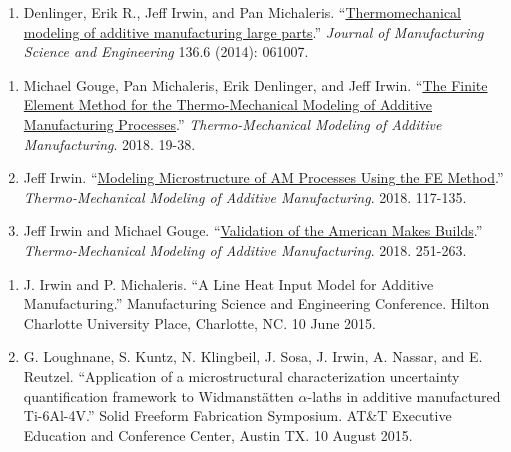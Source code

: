 \documentclass[10.5pt,letterpaper]{article}
\begin{document}
\begin{enumerate}[leftmargin=*]
	\item Denlinger, Erik R., Jeff Irwin, and Pan Michaleris. ``\href{http://manufacturingscience.asmedigitalcollection.asme.org/article.aspx?articleid=1910535}{Thermomechanical modeling of additive manufacturing large parts}.'' \emph{Journal of Manufacturing Science and Engineering} 136.6 (2014): 061007.
\end{enumerate}

\begin{enumerate}[leftmargin=*]
	\setlength{\parskip}{0em}
	\item Michael Gouge, Pan Michaleris, Erik Denlinger, and Jeff Irwin.  ``\href{https://www.sciencedirect.com/science/article/pii/B9780128118207000033}{The Finite Element Method for the Thermo-Mechanical Modeling of Additive Manufacturing Processes}.'' \emph{Thermo-Mechanical Modeling of Additive Manufacturing}. 2018. 19-38.
	\item Jeff Irwin.  ``\href{https://www.sciencedirect.com/science/article/pii/B9780128118207000094}{Modeling Microstructure of AM Processes Using the FE Method}.'' \emph{Thermo-Mechanical Modeling of Additive Manufacturing}. 2018. 117-135.
	\item Jeff Irwin and Michael Gouge.  ``\href{https://www.sciencedirect.com/science/article/pii/B9780128118207000185}{Validation of the American Makes Builds}.'' \emph{Thermo-Mechanical Modeling of Additive Manufacturing}. 2018. 251-263.
\end{enumerate}

\spacedhrule{0.5em}{-0.5em}
\begin{enumerate}[leftmargin=*]
	\setlength{\parskip}{0em}
	\item J. Irwin and P. Michaleris. ``A Line Heat Input Model for Additive Manufacturing.'' Manufacturing Science and Engineering Conference. Hilton Charlotte University Place, Charlotte, NC. 10 June 2015.
	\item G. Loughnane, S. Kuntz, N. Klingbeil, J. Sosa, J. Irwin, A. Nassar, and E. Reutzel. ``Application of a microstructural characterization uncertainty quantification framework to Widmanst\"atten $\alpha$-laths in additive manufactured Ti-6Al-4V.'' Solid Freeform Fabrication Symposium. AT\&T Executive Education and Conference Center, Austin TX. 10 August 2015.
\end{enumerate}
\end{document}
